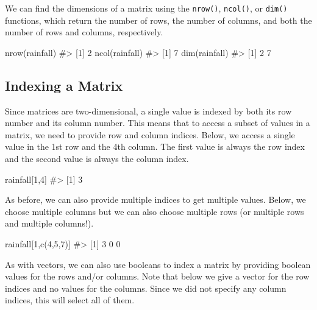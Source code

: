 \documentclass[
  letterpaper,
]{krantz}
\makeatletter
\newenvironment{Shaded}{\begin{snugshade}}{\end{snugshade}}
\newcommand{\CommentTok}[1]{\textcolor[rgb]{0.37,0.37,0.37}{#1}}
\newcommand{\DecValTok}[1]{\textcolor[rgb]{0.68,0.00,0.00}{#1}}
\newcommand{\FunctionTok}[1]{\textcolor[rgb]{0.28,0.35,0.67}{#1}}
\newcommand{\NormalTok}[1]{\textcolor[rgb]{0.00,0.23,0.31}{#1}}
\newenvironment{kframe}{%
\medskip{}
\setlength{\fboxsep}{.8em}
 \def\at@end@of@kframe{}%
 \ifinner\ifhmode%
  \def\at@end@of@kframe{\end{minipage}}%
  \begin{minipage}{\columnwidth}%
 \fi\fi%
 \def\FrameCommand##1{\hskip\@totalleftmargin \hskip-\fboxsep
 \colorbox{shadecolor}{##1}\hskip-\fboxsep
     \hskip-\linewidth \hskip-\@totalleftmargin \hskip\columnwidth}%
 \MakeFramed {\advance\hsize-\width
   \@totalleftmargin\z@ \linewidth\hsize
   \@setminipage}}%
 {\par\unskip\endMakeFramed%
 \at@end@of@kframe}
\renewenvironment{Shaded}{\begin{kframe}}{\end{kframe}}
\makeatother
\begin{document}
We can find the dimensions of a matrix using the \texttt{nrow()},
\texttt{ncol()}, or \texttt{dim()} functions, which return the number of
rows, the number of columns, and both the number of rows and columns,
respectively.

\begin{Shaded}
\begin{Highlighting}[]
\FunctionTok{nrow}\NormalTok{(rainfall)}
\CommentTok{\#\textgreater{} [1] 2}
\FunctionTok{ncol}\NormalTok{(rainfall)}
\CommentTok{\#\textgreater{} [1] 7}
\FunctionTok{dim}\NormalTok{(rainfall)}
\CommentTok{\#\textgreater{} [1] 2 7}
\end{Highlighting}
\end{Shaded}

\hypertarget{indexing-a-matrix}{%
\subsection{Indexing a Matrix}\label{indexing-a-matrix}}

Since matrices are two-dimensional, a single value is indexed by both
its row number and its column number. This means that to access a subset
of values in a matrix, we need to provide row and column indices. Below,
we access a single value in the 1st row and the 4th column. The first
value is always the row index and the second value is always the column
index.

\begin{Shaded}
\begin{Highlighting}[]
\NormalTok{rainfall[}\DecValTok{1}\NormalTok{,}\DecValTok{4}\NormalTok{]}
\CommentTok{\#\textgreater{} [1] 3}
\end{Highlighting}
\end{Shaded}

As before, we can also provide multiple indices to get multiple values.
Below, we choose multiple columns but we can also choose multiple rows
(or multiple rows and multiple columns!).

\begin{Shaded}
\begin{Highlighting}[]
\NormalTok{rainfall[}\DecValTok{1}\NormalTok{,}\FunctionTok{c}\NormalTok{(}\DecValTok{4}\NormalTok{,}\DecValTok{5}\NormalTok{,}\DecValTok{7}\NormalTok{)]}
\CommentTok{\#\textgreater{} [1] 3 0 0}
\end{Highlighting}
\end{Shaded}

As with vectors, we can also use booleans to index a matrix by providing
boolean values for the rows and/or columns. Note that below we give a
vector for the row indices and no values for the columns. Since we did
not specify any column indices, this will select all of them.
\end{document}
